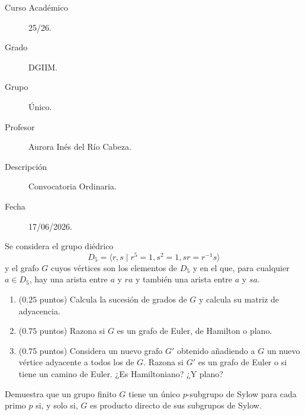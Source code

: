 \documentclass[12pt]{article}
\begin{document}

    
    

    \begin{description}
        \item[Curso Académico] 25/26.
        \item[Grado] DGIIM.
        \item[Grupo] Único.
        \item[Profesor] Aurora Inés del Río Cabeza.
        \item[Descripción] Convocatoria Ordinaria.
        \item[Fecha] 17/06/2026.
    \end{description}
    \newpage


    
    \begin{ejercicio}[$1.75$ puntos]
        Se considera el grupo diédrico $$D_5 = \langle r, s \mid r^5 = 1, s^2 = 1, sr = r^{-1}s \rangle$$ y el grafo $G$ cuyos vértices son los elementos de $D_5$ y en el que, para cualquier $a \in D_5$, hay una arista entre $a$ y $ra$ y también una arista entre $a$ y $sa$.
        
        \begin{enumerate}[label=\alph*)]
            \item ($0.25$ puntos) Calcula la sucesión de grados de $G$ y calcula su matriz de adyacencia.
            \item ($0.75$ puntos) Razona si $G$ es un grafo de Euler, de Hamilton o plano.
            \item ($0.75$ puntos) Considera un nuevo grafo $G'$ obtenido añadiendo a $G$ un nuevo vértice adyacente a todos los de $G$. Razona si $G'$ es un grafo de Euler o si tiene un camino de Euler. ¿Es Hamiltoniano? ¿Y plano?
        \end{enumerate}
    \end{ejercicio}

    \begin{ejercicio}[$0.75$ puntos]
        Demuestra que un grupo finito $G$ tiene un único $p$-subgrupo de Sylow para cada primo $p$ si, y solo si, $G$ es producto directo de sus subgrupos de Sylow.
    \end{ejercicio}
\end{document}
